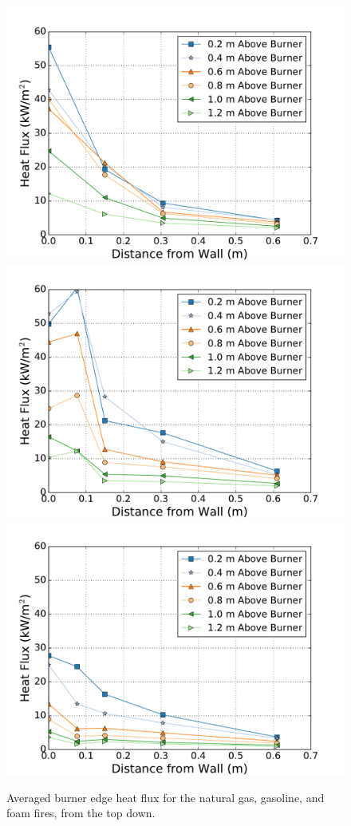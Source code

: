 \documentclass[twoside]{uocthesis}
\begin{document}
\begin{figure}[p]
	\centering
	\includegraphics[width=.625\columnwidth]{../Figures/IWGB_NG_HF_Offset_Avg}\\
	\includegraphics[width=.625\columnwidth]{../Figures/IWGB_GAS_HF_Offset_Avg}\\
	\includegraphics[width=.625\columnwidth]{../Figures/IWGB_PUF_HF_Offset_Avg}\\
	\caption[Averaged burner edge heat flux for the natural gas, gasoline, and foam fires]{Averaged burner edge heat flux for the natural gas, gasoline, and foam fires, from the top down.}
	\label{IWGB_HF_Comp_Edge}
\end{figure}
\end{document}
